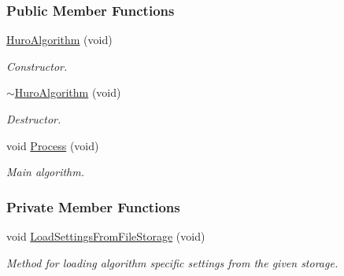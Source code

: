 \subsubsection*{Public Member Functions}
\begin{DoxyCompactItemize}
\item 
\hyperlink{group___object_recognition_a5213ab22da2dba36f16262c1a84ec261}{Huro\-Algorithm} (void)
\begin{DoxyCompactList}\small\item\em Constructor. \end{DoxyCompactList}\item 
\hyperlink{group___object_recognition_a0c00c5a74d3415f926f599c2ea9cedce}{$\sim$\-Huro\-Algorithm} (void)
\begin{DoxyCompactList}\small\item\em Destructor. \end{DoxyCompactList}\item 
void \hyperlink{group___object_recognition_ac2e91407459c4ebac0b33f7e7570022d}{Process} (void)
\begin{DoxyCompactList}\small\item\em Main algorithm. \end{DoxyCompactList}\end{DoxyCompactItemize}
\subsubsection*{Private Member Functions}
\begin{DoxyCompactItemize}
\item 
void \hyperlink{group___object_recognition_a1cfbc787c7380f981407daf1afbbad12}{Load\-Settings\-From\-File\-Storage} (void)
\begin{DoxyCompactList}\small\item\em Method for loading algorithm specific settings from the given storage. \end{DoxyCompactList}\end{DoxyCompactItemize}
